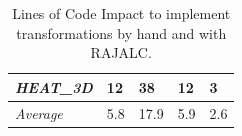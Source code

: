 \documentclass{article}
\begin{document}
\begin{table}[t]
\begin{tabular}{|l|l|l|l|l|}
    \\
    \textit{HEAT\_3D}        & 12                                              & 38                                           & 12                                             & 3                                            \\ \hline
    \textit{Average}        & 5.8                                              & 17.9                                           & 5.9                                            & 2.6                                            \\ \hline
    \end{tabular}
    \caption{Lines of Code Impact to implement transformations by hand and with RAJALC.}\label{sloc}
    \end{table}
\end{document}
